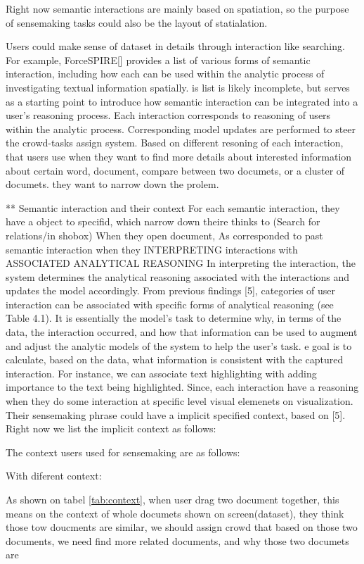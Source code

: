 \documentclass[journal]{vgtc}                %
\begin{document}
Right now semantic interactions are mainly based on spatiation, so the purpose of sensemaking tasks could also be the layout of statialation.

Users could make sense of dataset in details through interaction like searching.
For example, ForceSPIRE[] provides a list of various forms of semantic interaction, including how each can be used within the analytic process of investigating textual information spatially.
is list is likely incomplete, but serves as a starting point to introduce how semantic interaction can be integrated into a user’s reasoning process.
Each interaction corresponds to reasoning of users within the analytic process.
Corresponding model updates are performed to steer the crowd-tasks assign system.
Based on different resoning of each interaction, that users use when they want to find more details about interested information about certain word, document, compare between two documets, or a cluster of documets.
they want to narrow down the prolem.

** Semantic interaction and their context
For each semantic interaction, they have a object to specifid, which narrow down theire thinks to (Search for relations/in shobox)
When they open document,
As corresponded to past semantic interaction when they INTERPRETING interactions with ASSOCIATED ANALYTICAL REASONING
In interpreting the interaction, the system determines the analytical reasoning associated with the interactions and updates the model accordingly. From previous findings [5], categories of user interaction can be associated with specific forms of analytical reasoning (see Table 4.1). It is essentially the model’s task to determine why, in terms of the data, the interaction occurred, and how that information can be used to augment and adjust the analytic models of the system to help the user’s task. e goal is to calculate, based on the data, what information is consistent with the captured interaction. For instance, we can associate text highlighting with adding importance to the text being highlighted.
Since, each interaction have a reasoning when they do some interaction at specific level visual elemenets on visualization.
Their sensemaking phrase could have a implicit specified context, based on [5].
Right now we list the implicit context as follows:

The context users used for sensemaking are as follows:

With diferent context:

As shown on tabel \autoref{tab:context}, when user drag two document together, this means on the context of whole documets shown on screen(dataset), they think those tow doucments are similar, we should assign crowd that based on those two documents, we need find more related documents,
and why those two documets are
\end{document}
